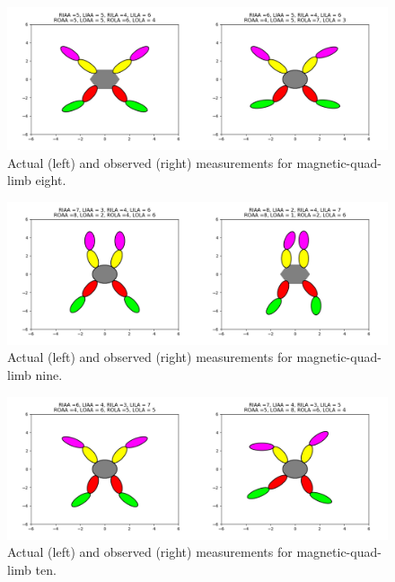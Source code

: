 \documentclass{article}
\begin{document}
\begin{figure}[!ht]
	\centering
	\includegraphics[width=120mm]{figs/mql-8.png}
	\caption{Actual (left) and observed (right) measurements for magnetic-quad-limb eight.}
\end{figure}
\begin{figure}[!ht]
	\centering
	\includegraphics[width=120mm]{figs/mql-9.png}
	\caption{Actual (left) and observed (right) measurements for magnetic-quad-limb nine.}
\end{figure}
\begin{figure}[!ht]
	\centering
	\includegraphics[width=120mm]{figs/mql-10.png}
	\caption{Actual (left) and observed (right) measurements for magnetic-quad-limb ten.}
\end{figure}

~\\
~\\
~\\
~\\
~\\
~\\
~\\
~\\
~\\
~\\
~\\
~\\
~\\
~\\
~\\
~\\
~\\
~\\
~\\
~\\
~\\
~\\
~\\
\end{document}
